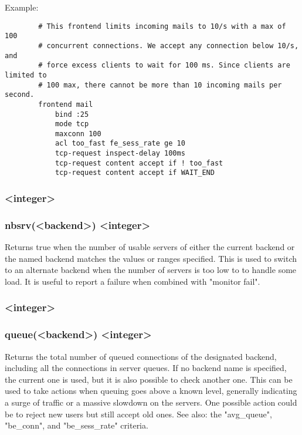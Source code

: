   Example:
  \begin{verbatim}
        # This frontend limits incoming mails to 10/s with a max of 100
        # concurrent connections. We accept any connection below 10/s, and
        # force excess clients to wait for 100 ms. Since clients are limited to
        # 100 max, there cannot be more than 10 incoming mails per second.
        frontend mail
            bind :25
            mode tcp
            maxconn 100
            acl too_fast fe_sess_rate ge 10
            tcp-request inspect-delay 100ms
            tcp-request content accept if ! too_fast
            tcp-request content accept if WAIT_END
  \end{verbatim}

\subsubsection[nbsrv]{ <integer>}
\subsubsection*{nbsrv(<backend>) <integer>}
  Returns true when the number of usable servers of either the current backend
  or the named backend matches the values or ranges specified. This is used to
  switch to an alternate backend when the number of servers is too low to
  to handle some load. It is useful to report a failure when combined with
  "monitor fail".

\subsubsection[queue]{ <integer>}
\subsubsection*{queue(<backend>) <integer>}
  Returns the total number of queued connections of the designated backend,
  including all the connections in server queues. If no backend name is
  specified, the current one is used, but it is also possible to check another
  one. This can be used to take actions when queuing goes above a known level,
  generally indicating a surge of traffic or a massive slowdown on the servers.
  One possible action could be to reject new users but still accept old ones.
  See also: the "avg\_queue", "be\_conn", and "be\_sess\_rate" criteria.

\subsubsection[sc1\_bytes\_in\_rate]{}
